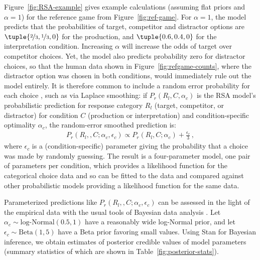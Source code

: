 \documentclass[fleqn]{article}
\begin{document}
Figure~\ref{fig:RSA-example} gives example calculations (assuming flat priors and $\alpha=1$) for the reference game from Figure~\ref{fig:ref-game}.
For $\alpha=1$, the model predicts that the probabilities of target, competitor and distractor options are $\tuple{\nicefrac{2}{3}, \nicefrac{1}{3}, 0}$ for the production, and $\tuple{0.6, 0.4, 0}$ for the interpretation condition.
Increasing $\alpha$ will increase the odds of target over competitor choices.
Yet, the model also predicts probability zero for distractor choices, so that the human data shown in Figure~\ref{fig:refgame-counts}, where the distractor option was chosen in both conditions, would immediately rule out the model entirely.
It is therefore common to include a random error probability for each choice \citep[e.g.,][]{LeeWagenmakers2013:Bayesian-Cognit}, such as via Laplace smoothing: if $P_{r}(R_{l}, C, \alpha_{c})$ is the RSA model's probabilistic prediction for response category $R_{l}$ (target, competitor, or distractor) for condition $C$ (production or interpretation) and condition-specific optimality $\alpha_{c}$, the random-error smoothed prediction is:
\begin{align*}
  P_{r}(R_{l}, , C; \alpha_{c}, \epsilon_{c}) \propto P_{r}(R_{l}, C; \alpha_{c}) +  \frac{\epsilon_{c}}{3}\,,
\end{align*}
where $\epsilon_{c}$ is a (condition-specific) parameter giving the probability that a choice was made by randomly guessing.
The result is a four-parameter model, one pair of parameters per condition, which provides a likelihood function for the categorical choice data and so can be fitted to the data and compared against other probabilistic models providing a likelihood function for the same data.

Parameterized predictions like $P_{r}(R_{l}, , C; \alpha_{c}, \epsilon_{c})$ can be assessed in the light of the empirical data with the usual tools of Bayesian data analysis \citep[e.g.][]{GelmanCarlin2014:Bayesian-Data-A,McElreath2016:Statistical-Ret,Lambert2018:A-Students-Guid}.
Let $\alpha_{c}\sim \text{log-Normal}(0.5,1)$ have a reasonably wide log-Normal prior, and let $\epsilon_{c} \sim \text{Beta}(1,5)$ have a Beta prior favoring small values.
Using Stan \citep{Team2023:The-Stan-Core-L} for Bayesian inference, we obtain estimates of posterior credible values of model parameters (summary statistics of which are shown in Table~\ref{fig:posterior-stats}).
\end{document}
